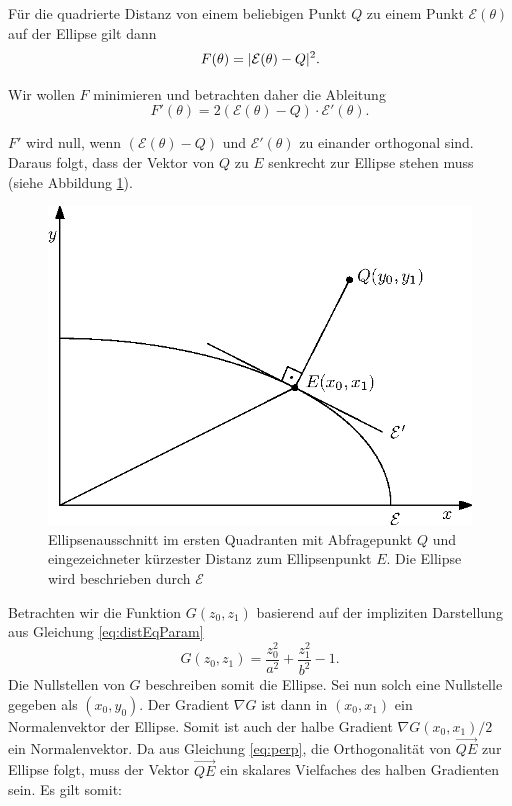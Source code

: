 Für die quadrierte Distanz von einem beliebigen Punkt $Q$ zu einem Punkt $\mathcal{E}(\theta)$ auf der Ellipse gilt dann
\begin{equation}
	F(\theta) = \lvert\mathcal{E}(\theta) - Q\rvert^2.
\end{equation}

Wir wollen $F$ minimieren und betrachten daher die Ableitung
\begin{equation}\label{eq:perp}
F'(\theta) = 2\left(\mathcal{E}(\theta) - Q\right) \cdot \mathcal{E}'(\theta).
\end{equation}

$F'$ wird null, wenn $\left(\mathcal{E}(\theta) - Q\right)$ und $ \mathcal{E}'(\theta)$ zu einander orthogonal sind. Daraus folgt, dass der Vektor von $Q$ zu $E$ senkrecht zur Ellipse stehen muss (siehe Abbildung \ref{fig:ellipseDist}). 


\begin{figure}[!htb]
	\centering
	\includegraphics[scale=.9]{images/ellipseQuery.eps}
	\caption{Ellipsenausschnitt im ersten Quadranten mit Abfragepunkt $Q$ und eingezeichneter kürzester Distanz zum Ellipsenpunkt $E$. Die Ellipse wird beschrieben durch $\mathcal{E}$}
	\label{fig:ellipseDist}
\end{figure}

Betrachten wir die Funktion $G(z_0,z_1)$ basierend auf der impliziten Darstellung aus Gleichung \ref{eq:distEqParam}
\begin{equation} \label{eq:ellipseDistEq}
	G(z_0,z_1) = \frac{z_0^2}{a^2} + \frac{z_1^2}{b^2} - 1.
\end{equation}
Die Nullstellen von $G$ beschreiben somit die Ellipse. Sei nun solch eine Nullstelle gegeben als $(x_0,y_0)$. Der Gradient $\nabla G$ ist dann in $(x_0,x_1)$ ein Normalenvektor der Ellipse. Somit ist auch der halbe Gradient $\nabla G(x_0,x_1)/2$ ein Normalenvektor. Da aus Gleichung \ref{eq:perp}, die Orthogonalität von $\overrightarrow{QE}$ zur Ellipse folgt,  muss der Vektor  $\overrightarrow{QE}$ ein skalares Vielfaches des halben Gradienten sein. Es gilt somit:

